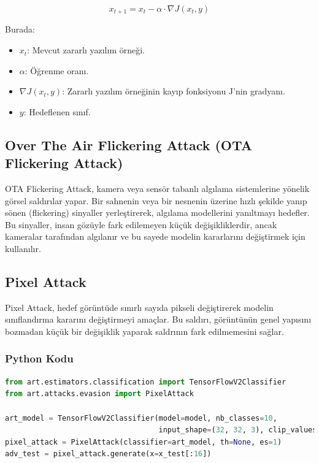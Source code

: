 \[ x_{t+1} = x_t - \alpha \cdot \nabla J(x_t, y) \]

Burada:

\begin{itemize}
    \item $x_t$: Mevcut zararlı yazılım örneği.
    \item $\alpha$: Öğrenme oranı.
    \item $\nabla J(x_t, y)$: Zararlı yazılım örneğinin kayıp fonksiyonu J'nin gradyanı.
    \item $y$: Hedeflenen sınıf.
\end{itemize}

\newpage

\subsection{Over The Air Flickering Attack (OTA Flickering Attack)}

OTA Flickering Attack, kamera veya sensör tabanlı algılama sistemlerine yönelik görsel saldırılar yapar. Bir sahnenin veya bir nesnenin üzerine hızlı şekilde yanıp sönen (flickering) sinyaller yerleştirerek, algılama modellerini yanıltmayı hedefler. Bu sinyaller, insan gözüyle fark edilemeyen küçük değişikliklerdir, ancak kameralar tarafından algılanır ve bu sayede modelin kararlarını değiştirmek için kullanılır.

\newpage

\subsection{Pixel Attack}

Pixel Attack, hedef görüntüde sınırlı sayıda pikseli değiştirerek modelin sınıflandırma kararını değiştirmeyi amaçlar. Bu saldırı, görüntünün genel yapısını bozmadan küçük bir değişiklik yaparak saldrının fark edilmemesini sağlar.

\subsubsection{Python Kodu}

\begin{lstlisting}[language=Python]
from art.estimators.classification import TensorFlowV2Classifier
from art.attacks.evasion import PixelAttack

art_model = TensorFlowV2Classifier(model=model, nb_classes=10, 
                                   input_shape=(32, 32, 3), clip_values=(0, 1))
pixel_attack = PixelAttack(classifier=art_model, th=None, es=1)
adv_test = pixel_attack.generate(x=x_test[:16])
\end{lstlisting}

